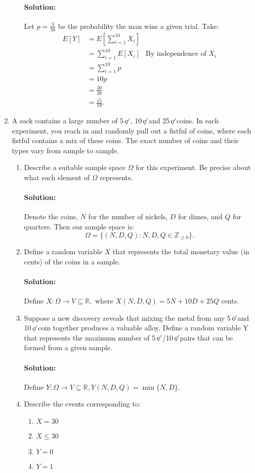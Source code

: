 \documentclass{article}
\newcommand{\cent}{\ensuremath{\,\not\!\!c\,\,}}
\begin{document}
\begin{enumerate}
\begin{enumerate}
        \paragraph{Solution: }Let $p=\frac{3}{38}$ %
        be the probability the man wins a given trial. Take:
        \begin{align*}
            E[Y]&=E\left[ \sum_{i=1}^{10} X_i \right] \\
                &= \sum_{i=1}^{10} E[X_i]&\text{By independence of }X_i \\
                &= \sum_{i=1}^{10} p \\
                &= 10p \\
                &= \frac{30}{38}\\
                &= \frac{15}{19} 
        .\end{align*}
\end{enumerate}
\item A sack contains a large number of 5\cent, 10\cent and 25\cent coins. In each experiment, you reach in and randomly pull out a fistful of coins, where each fistful contains a mix of these coins. The exact number of coins and their types vary from sample to sample.
    \begin{enumerate}
    \item Describe a suitable sample space $\Omega$ for this experiment. Be precise about what each element of $\Omega$ represents.
        \paragraph{Solution: }Denote the coins, $N$ for the number of nickels, $D$ for dimes, and $Q $ for quarters. Then our sample space is:
        \[
        \Omega=\{(N,D,Q):N,D,Q\in \mathbb{Z}_{\ge 0}\} 
        .\] 
    \item Define a random variable $X$ that represents the total monetary value (in cents) of the coins in a sample.
        \paragraph{Solution: }Define $X:\Omega\to V\subseteq \mathbb{R},$ where $X(N,D,Q)=5N+10D+25Q$ cents.
    \item Suppose a new discovery reveals that mixing the metal from any 5\cent and 10\cent coin together produces a valuable alloy. Define a random variable Y that represents the maximum number of 5\cent/10\cent pairs that can be formed from a given sample.
        \paragraph{Solution: }Define $Y:\Omega\to V\subseteq \mathbb{R}, Y(N,D,Q)=\min \{N,D\} $.
    \item Describe the events corresponding to:
        \begin{enumerate}
            \item $X=30$
            \item $X \leq 30$
            \item $Y = 0$
            \item $Y = 1$
        \end{enumerate}

\end{enumerate}
\end{enumerate}
\end{document}
